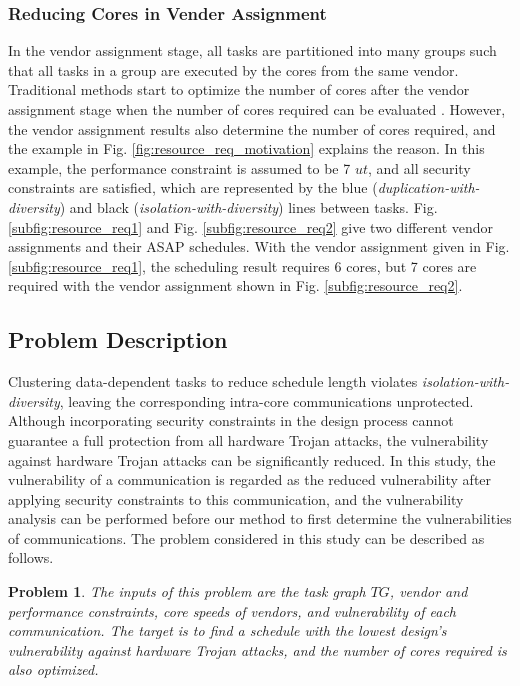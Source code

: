 \documentclass[10pt,journal, compsoc]{IEEEtran}
\newtheorem{problem}{\textbf{Problem}}
\begin{document}
\subsubsection{Reducing Cores in Vender Assignment}

In the vendor assignment stage, all tasks are partitioned into many groups such that all tasks in a group are executed by the cores from the same vendor. Traditional methods start to optimize the number of cores after the vendor assignment stage when the number of cores required can be evaluated \cite{article:YS, article:XC, article:CL, article:NW}. However, the vendor assignment results also determine the number of cores required, and the example in Fig. \ref{fig:resource_req_motivation} explains the reason. In this example, the performance constraint is assumed to be 7 $ut$, and all security constraints are satisfied, which are represented by the blue (\textit{duplication-with-diversity}) and black (\textit{isolation-with-diversity}) lines between tasks. Fig. \ref{subfig:resource_req1} and Fig. \ref{subfig:resource_req2} give two different vendor assignments and their ASAP schedules. With the vendor assignment given in Fig. \ref{subfig:resource_req1}, the scheduling result requires 6 cores, but 7 cores are required with the vendor assignment shown in Fig. \ref{subfig:resource_req2}.






\subsection{Problem Description}

Clustering data-dependent tasks to reduce schedule length violates \textit{isolation-with-diversity}, leaving the corresponding intra-core communications unprotected. Although incorporating security constraints in the design process cannot guarantee a full protection from all hardware Trojan attacks, the vulnerability against hardware Trojan attacks can be significantly reduced. In this study, the vulnerability of a communication is regarded as the reduced vulnerability after applying security constraints to this communication, and the vulnerability analysis \cite{conference:HS} can be performed before our method to first determine the vulnerabilities of communications. The problem considered in this study can be described as follows.

\begin{problem}
The inputs of this problem are the task graph $TG$, vendor and performance constraints, core speeds of vendors, and vulnerability of each communication. The target is to find a schedule with the lowest design's vulnerability against hardware Trojan attacks, and the number of cores required is also optimized.
\end{problem}
\end{document}

